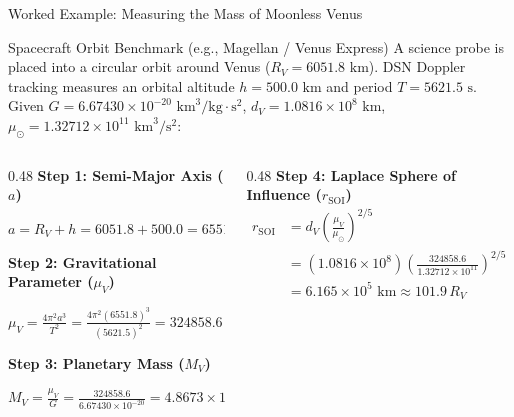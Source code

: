 \documentclass[aspectratio=169, 10pt]{beamer}
\begin{document}
\begin{frame}{Worked Example: Measuring the Mass of Moonless Venus}
    \begin{exampleblock}{Spacecraft Orbit Benchmark (e.g., Magellan / Venus Express)}
        \scriptsize
        A science probe is placed into a circular orbit around Venus ($R_V = 6051.8\text{ km}$). DSN Doppler tracking measures an orbital altitude $h = 500.0\text{ km}$ and period $T = 5621.5\text{ s}$. \\
        Given $G = 6.67430 \times 10^{-20}\text{ km}^3/\text{kg}\cdot\text{s}^2$, $d_V = 1.0816 \times 10^8\text{ km}$, $\mu_\odot = 1.32712 \times 10^{11}\text{ km}^3/\text{s}^2$:
    \end{exampleblock}

    \vspace{-0.1cm}

    \begin{columns}[t]
        \begin{column}{0.48\textwidth}
            \scriptsize
            \textbf{Step 1: Semi-Major Axis ($a$)}
            \par\vspace{1pt}
            $a = R_V + h = 6051.8 + 500.0 = \mathbf{6551.8}\text{ km}$

            \vspace{0.08cm}
            \textbf{Step 2: Gravitational Parameter ($\mu_V$)}
            \par\vspace{1pt}
            $\mu_V = \frac{4\pi^2 a^3}{T^2} = \frac{4\pi^2 (6551.8)^3}{(5621.5)^2} = \mathbf{324858.6}\text{ km}^3/\text{s}^2$

            \vspace{0.08cm}
            \textbf{Step 3: Planetary Mass ($M_V$)}
            \par\vspace{1pt}
            $M_V = \frac{\mu_V}{G} = \frac{324858.6}{6.67430 \times 10^{-20}} = \mathbf{4.8673} \times 10^{24}\text{ kg}$
        \end{column}

        \begin{column}{0.48\textwidth}
            \scriptsize
            \textbf{Step 4: Laplace Sphere of Influence ($r_{\text{SOI}}$)}
            \begin{align*}
                r_{\text{SOI}} &= d_V \left(\frac{\mu_V}{\mu_\odot}\right)^{2/5} \\
                &= (1.0816 \times 10^8)\left(\frac{324858.6}{1.32712 \times 10^{11}}\right)^{2/5} \\
                &= \mathbf{6.165} \times 10^5\text{ km} \approx \mathbf{101.9}\,R_V
            \end{align*}


\end{column}
\end{columns}
\end{frame}
\end{document}
